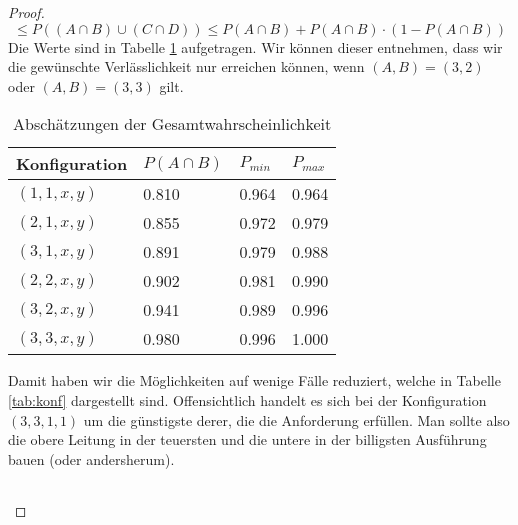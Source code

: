 \documentclass[a4paper]{scrartcl}
\begin{document}
\begin{enumerate}[label=\bfseries\arabic*.]
\begin{proof}
\begin{equation*}
                        \leq P((A \cap B) \cup (C \cap D))
                        \leq P(A \cap B) + P(A \cap B) \cdot (1 - P(A \cap B))
                    \end{equation*}
                    Die Werte sind in Tabelle \ref{tab:absch} aufgetragen.
                    Wir können dieser entnehmen, dass wir die gewünschte
                    Verlässlichkeit nur erreichen können, wenn
                    $(A, B) = (3, 2)$ oder $(A, B) = (3, 3)$ gilt.
                    \begin{table}
                        \centering
                        \begin{tabular}{l|l|l|l}
                            Konfiguration & $P(A \cap B)$ & $P_{min}$ & $P_{max}$ \\
                            \hline
                            $(1, 1, x, y)$ & \num{0.810} & \num{0.964} & \num{0.964} \\
                            $(2, 1, x, y)$ & \num{0.855} & \num{0.972} & \num{0.979} \\
                            $(3, 1, x, y)$ & \num{0.891} & \num{0.979} & \num{0.988} \\
                            $(2, 2, x, y)$ & \num{0.902} & \num{0.981} & \num{0.990} \\
                            $(3, 2, x, y)$ & \num{0.941} & \num{0.989} & \num{0.996} \\
                            $(3, 3, x, y)$ & \num{0.980} & \num{0.996} & \num{1.000} \\%
                        \end{tabular}
                        \caption{Abschätzungen der Gesamtwahrscheinlichkeit}
                        \label{tab:absch}
                    \end{table}
                    Damit haben wir die Möglichkeiten auf wenige Fälle
                    reduziert, welche in Tabelle \ref{tab:konf} dargestellt
                    sind.
                    Offensichtlich handelt es sich bei der Konfiguration
                    $(3, 3, 1, 1)$ um die günstigste derer, die die Anforderung
                    erfüllen.
                    Man sollte also die obere Leitung in der teuersten und die
                    untere in der billigsten Ausführung bauen
                    (oder andersherum).
                    \begin{table}
                        \centering
                        \begin{tabular}{l|l|l}

\end{tabular}
\end{table}
\end{proof}
\end{enumerate}
\end{document}
